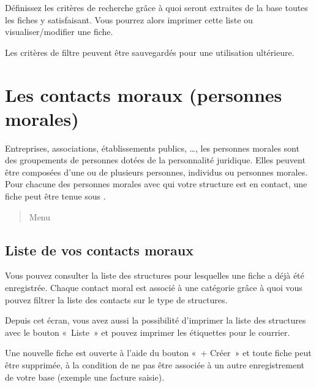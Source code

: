 \documentclass[a4paper,10pt,oneside,french]{sphinxmanual}
\begin{document}
\sphinxAtStartPar
Définissez les critères de recherche grâce à quoi seront extraites de la base toutes les fiches y satisfaisant.
Vous pourrez alors imprimer cette liste ou visualiser/modifier une fiche.

\noindent{}

\sphinxAtStartPar
Les critères de filtre peuvent être sauvegardés pour une utilisation ultérieure.

\sphinxstepscope


\section{Les contacts moraux (personnes morales)}
\label{\detokenize{contacts/legal_entity:les-contacts-moraux-personnes-morales}}\label{\detokenize{contacts/legal_entity::doc}}
\sphinxAtStartPar
Entreprises, associations, établissements publics, …, les personnes morales sont des groupements de personnes dotées de la personnalité juridique. Elles peuvent être composées d’une ou de plusieurs personnes, individus ou personnes morales.
Pour chacune des personnes morales avec qui votre structure est en contact, une fiche peut être tenue sous .
\begin{quote}

\sphinxAtStartPar
Menu 
\end{quote}


\subsection{Liste de vos contacts moraux}
\label{\detokenize{contacts/legal_entity:liste-de-vos-contacts-moraux}}
\sphinxAtStartPar
Vous pouvez consulter la liste des structures pour lesquelles une fiche a déjà été enregistrée.
Chaque contact moral est associé à une catégorie grâce à quoi vous pouvez filtrer la liste des contacts sur le type de structures.

\noindent{}

\sphinxAtStartPar
Depuis cet écran, vous avez aussi la possibilité d’imprimer la liste des structures avec le bouton « Liste » et pouvez imprimer les étiquettes pour le courrier.

\sphinxAtStartPar
Une nouvelle fiche est ouverte à l’aide du bouton « + Créer » et toute fiche peut être supprimée, à la condition de ne pas être associée à un autre enregistrement de votre base (exemple une facture saisie).
\end{document}
